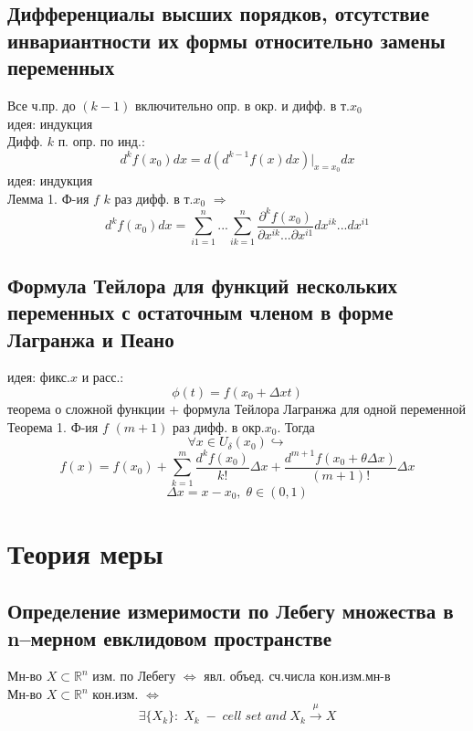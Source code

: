 \documentclass{article}
\begin{document}
\subsection{Дифференциалы высших порядков, отсутствие инвариантности их формы относительно замены переменных}
Все ч.пр. до $(k-1)$ включительно опр. в окр. и дифф. в т.$x_0$ \\
идея: индукция \\
Дифф. $k$ п. опр. по инд.:
\begin{equation*}
    d^k f(x_0) dx = d(d^{k-1} f(x) dx) \bigg |_{x=x_0} dx
\end{equation*}
идея: индукция \\
Лемма 1. Ф-ия $f$ $k$  раз дифф. в т.$x_0$ $\Rightarrow$
\begin{equation*}
    d^k f(x_0) dx = \sum_{i1=1}^n ... \sum_{ik=1}^n \frac{\partial ^k f(x_0)}{\partial x^{ik} ... \partial x^{i1}} dx^{ik} ... dx^{i1}
\end{equation*}
\subsection{Формула Тейлора для функций нескольких переменных с остаточным членом в форме Лагранжа и Пеано}
идея: фикс.$x$ и расс.: \\
\begin{equation*}
    \phi (t) = f(x_0+ \Delta x t)
\end{equation*}
теорема о сложной функции + формула Тейлора Лагранжа для одной переменной \\
Теорема 1. Ф-ия $f$ $(m+1)$ раз дифф. в окр.$x_0$. Тогда
\begin{equation*}
    \forall x \in U_\delta(x_0) \hookrightarrow
\end{equation*}
\begin{equation*}
    f(x) = f(x_0) + \sum_{k=1}^{m} \frac{d^k f(x_0)}{k!} \Delta x + \frac{d^{m+1} f(x_0+ \theta \Delta x)}{(m+1)!} \Delta x
\end{equation*}
\begin{equation*}
    \Delta x = x - x_0, \; \theta \in (0, 1)
\end{equation*}


\section{Теория меры}

\subsection{Определение измеримости по Лебегу множества в n–мерном евклидовом пространстве}
Мн-во $X \subset \mathbb R^n$ изм. по Лебегу $\Leftrightarrow$ явл. объед. сч.числа кон.изм.мн-в \\
Мн-во $X \subset \mathbb R^n$ кон.изм. $\Leftrightarrow$
\begin{equation*}
    \exists \{ X_k \}: \; X_k \; - \; cell \; set \; and \; X_k \overset{\mu}{\rightarrow} X
\end{equation*}
\end{document}
